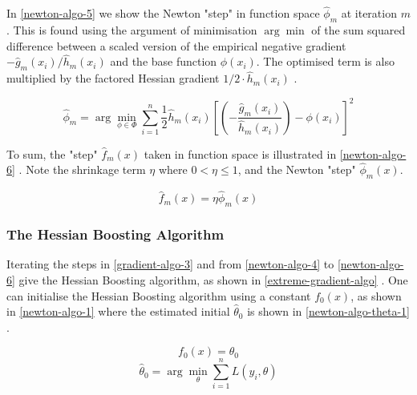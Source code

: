 In \autoref{newton-algo-5} we show the Newton "step" in function space $\hat{\phi}_m$ at iteration $m$ \parencite{ntnu-thesis-why-does-xgboost-win-every-machine-learning-competition}. This is found using the argument of minimisation $\arg\min$ of the sum squared difference between a scaled version of the empirical negative gradient $-\hat{g}_m(x_i)/\hat{h}_m(x_i)$ and the base function $\phi(x_i)$. The optimised term is also multiplied by the factored Hessian gradient $1/2\cdot\hat{h}_m(x_i)$ \parencite{ntnu-thesis-why-does-xgboost-win-every-machine-learning-competition}. 

\begin{equation}
\label{newton-algo-5}
    \hat{\phi}_m = \arg\min_{\phi\in\Phi} \sum_{i=1}^{n} \frac{1}{2} \hat{h}_m(x_i) \left[ (-\frac{\hat{g}_m(x_i)}{\hat{h}_m(x_i)}) - \phi(x_i) \right] ^2
\end{equation}

To sum, the "step" $\hat{f}_m(x)$ taken in function space is illustrated in \autoref{newton-algo-6} \parencite{ntnu-thesis-why-does-xgboost-win-every-machine-learning-competition}. Note the shrinkage term $\eta$ where $0<\eta\leq1$, and the Newton "step" $\hat{\phi}_m(x)$. 

\begin{equation}
\label{newton-algo-6}
    \hat{f}_m(x) = \eta\hat{\phi}_m(x)
\end{equation}

\subsubsection{The Hessian Boosting Algorithm}

Iterating the steps in \autoref{gradient-algo-3} and from \autoref{newton-algo-4} to \autoref{newton-algo-6} give the Hessian Boosting algorithm, as shown in \autoref{extreme-gradient-algo} \parencite{ntnu-thesis-why-does-xgboost-win-every-machine-learning-competition}. One can initialise the Hessian Boosting algorithm using a constant $f_0(x)$, as shown in \autoref{newton-algo-1} where the estimated initial $\hat{\theta}_0$ is shown in \autoref{newton-algo-theta-1} \parencite{ntnu-thesis-why-does-xgboost-win-every-machine-learning-competition}.  

\begin{equation}
\label{newton-algo-1}
    f_0(x)=\theta_0
\end{equation}
\begin{equation}
\label{newton-algo-theta-1}
    \hat{\theta}_0 = \arg\min_{\theta}\sum_{i=1}^{n}L(y_i,\theta)
\end{equation}

